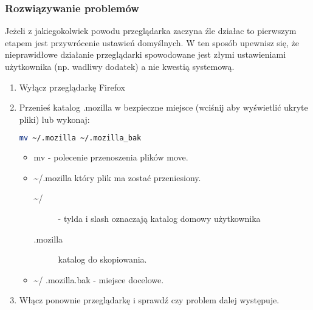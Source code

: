 \subsubsection{Rozwiązywanie problemów}
Jeżeli z jakiegokolwiek powodu przeglądarka zaczyna źle działac to pierwszym etapem jest przywrócenie ustawień domyślnych. W ten sposób upewnisz się, że nieprawidłowe działanie przeglądarki spowodowane jest złymi ustawieniami użytkownika (np. wadliwy dodatek) a nie kwestią systemową.
\begin{enumerate}
\item Wyłącz przeglądarkę Firefox
\item Przenieś katalog .mozilla w bezpieczne miejsce (wciśnij  aby wyświetlić ukryte pliki) lub wykonaj:
\begin{lstlisting}[language=bash]
mv ~/.mozilla ~/.mozilla_bak
\end{lstlisting}
\begin{itemize}
\item \textcolor{ubuntu_orange}{mv} - polecenie przenoszenia plików move.
\item \textcolor{ubuntu_orange}{\textasciitilde /.mozilla} który plik ma zostać przeniesiony.
	\begin{description}
	\item[\textasciitilde /] - tylda i slash oznaczają katalog domowy użytkownika
	\item[.mozilla] katalog do skopiowania.
	\end{description}
\item \textasciitilde / .mozilla.bak - miejsce docelowe.
\end{itemize}
\item Włącz ponownie przeglądarkę i sprawdź czy problem dalej występuje.
\end{enumerate}